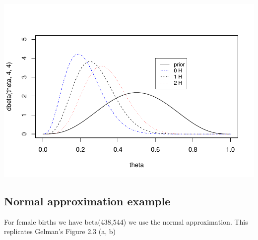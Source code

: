 \documentclass[
]{book}
\theoremstyle{definition}
\theoremstyle{definition}
\theoremstyle{definition}
\theoremstyle{definition}
\theoremstyle{remark}
\begin{document}
\includegraphics{_main_files/figure-latex/q1-1.pdf}

\hypertarget{normal-approximation-example}{%
\subsection*{Normal approximation example}\label{normal-approximation-example}}

For female births we have beta(438,544) we use the normal approximation. This replicates Gelman's Figure 2.3 (a, b)
\end{document}
